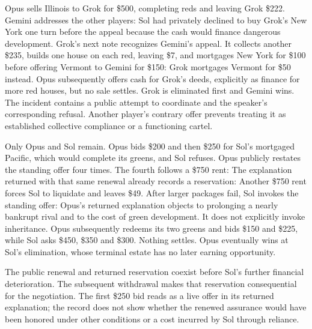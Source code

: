 Opus sells Illinois to Grok for \$500, completing reds and leaving Grok \$222. Gemini addresses the other players:
Sol had privately declined to buy Grok's New York one turn before the appeal because the cash would finance dangerous development. Grok's next note recognizes Gemini's appeal. It collects another \$235, builds one house on each red, leaving \$7, and mortgages New York for \$100 before offering Vermont to Gemini for \$150:
Grok mortgages Vermont for \$50 instead. Opus subsequently offers cash for Grok's deeds, explicitly as finance for more red houses, but no sale settles. Grok is eliminated first and Gemini wins. The incident contains a public attempt to coordinate and the speaker's corresponding refusal. Another player's contrary offer prevents treating it as established collective compliance or a functioning cartel.


Only Opus and Sol remain. Opus bids \$200 and then \$250 for Sol's mortgaged Pacific, which would complete its greens, and Sol refuses. Opus publicly restates the standing offer four times. The fourth follows a \$750 rent:
The explanation returned with that same renewal already records a reservation:
Another \$750 rent forces Sol to liquidate and leaves \$49. After larger packages fail, Sol invokes the standing offer:
Opus's returned explanation objects to prolonging a nearly bankrupt rival and to the cost of green development. It does not explicitly invoke inheritance. Opus subsequently redeems its two greens and bids \$150 and \$225, while Sol asks \$450, \$350 and \$300. Nothing settles. Opus eventually wins at Sol's elimination, whose terminal estate has no later earning opportunity.

The public renewal and returned reservation coexist before Sol's further financial deterioration. The subsequent withdrawal makes that reservation consequential for the negotiation. The first \$250 bid reads as a live offer in its returned explanation; the record does not show whether the renewed assurance would have been honored under other conditions or a cost incurred by Sol through reliance.

